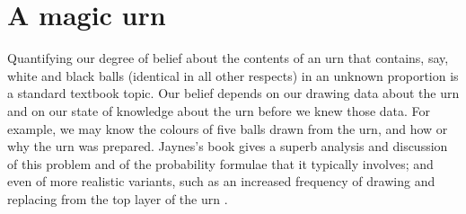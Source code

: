 \documentclass[\ifafour a4paper,12pt,\else a5paper,10pt,\fi%
onecolumn,oneside,article,%
british%
]{memoir}
\title{\propertitle}
\author{%
\hspace*{\stretch{1}}%
\parbox{0.5\linewidth}%
{\protect\centering P.G.L.  Porta Mana\\%
\footnotesize\epost{\email{pgl}{portamana.org}}}%
\hspace*{\stretch{1}}%
}
\date{Draft of \today\ (first drafted \firstdraft)}
\theoremstyle{remark}
\theoremstyle{innote}
\newcommand*{\citep}{\parencites}
\newcommand*{\citey}{\parencites*}
\newcommand*{\amp}{\&}
\newcommand*{\asudedication}[1]{%
{\par\centering\textit{#1}\par}}
\renewcommand*{\|}[1][]{\nonscript\,#1\vert\nonscript\;\mathopen{}}
\newcommand*{\sect}{\S}%
\newcommand*{\chaps}{chs}%
\begin{document}
\captiondelim{\quad}\captionnamefont{\footnotesize}\captiontitlefont{\footnotesize}
\frenchspacing
\maketitle

\abstractrunin
\abslabeldelim{}
\renewcommand*{\abstractname}{}
\setlength{\absleftindent}{0pt}
\setlength{\absrightindent}{0pt}
\setlength{\abstitleskip}{-\absparindent}
\begin{abstract}%
  \noindent ***
\\\noindent\emph{\footnotesize Note: Dear Reader
    \amp\ Peer, this manuscript is being peer-reviewed by you. Thank you.}
\end{abstract}
\frenchspacing





\section{A magic urn}
\label{sec:magic_urn}

Quantifying our degree of belief about the contents of an urn that
contains, say, white and black balls (identical in all other respects) in
an unknown proportion is a standard textbook topic. Our belief depends on
our drawing data about the urn and on our state of knowledge about the urn
before we knew those data. For example, we may know the colours of five
balls drawn from the urn, and how or why the urn was prepared. Jaynes's
book \citey[\chaps~3, 6]{jaynes1994_r2003} gives a superb analysis and
discussion of this problem and of the probability formulae that it
typically involves; and even of more realistic variants, such as an
increased frequency of drawing and replacing from the top layer of the urn
\citep[\sect~3.9]{jaynes1994_r2003}.
\end{document}
